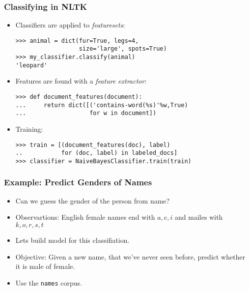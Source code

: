 \begin{frame}[fragile]\frametitle{Classifying in NLTK}
  \begin{itemize}
    \item Classifiers are applied to \emph{featuresets}:
{\small\begin{lstlisting}
>>> animal = dict(fur=True, legs=4, 
                  size='large', spots=True)
>>> my_classifier.classify(animal)
'leopard'
\end{lstlisting}}
    \item Features are found with a \emph{feature extractor}:
{\small\begin{lstlisting}
>>> def document_features(document):
...     return dict([('contains-word(%s)'%w,True) 
...                  for w in document])
\end{lstlisting}}
    \item Training:
{\small\begin{lstlisting}
>>> train = [(document_features(doc), label)
..           for (doc, label) in labeled_docs]
>>> classifier = NaiveBayesClassifier.train(train)
\end{lstlisting}}
  \end{itemize}
\end{frame}

\begin{frame}[fragile]\frametitle{Example: Predict Genders of Names}
  \begin{itemize}
\item Can we guess the gender of the person from name?
\item Observartions: English female names end with $a,e,i$ and mailes with $k,o,r,s,t$
\item Lets build model for this classifiation.
  \item Objective: Given a new name, that we've never seen before, predict
    whether it is male of female.
  \item Use the \texttt{names} corpus.
  \end{itemize}
\end{frame}

